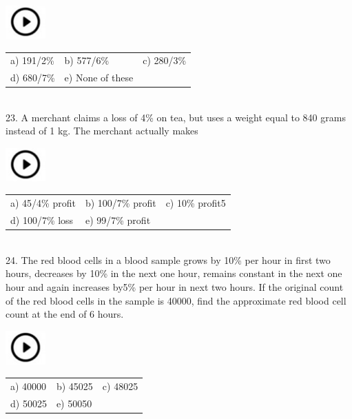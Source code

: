 \documentclass{article}
\begin{document}
\noindent   \includegraphics*[width=0.60in, height=0.52in]{images/image1} 
\begin{tabular}{p{1.7in} p{1.6in} p{1.6in}} \\ 
	a) 191/2\%   &  b) 577/6\%    & c) 280/3\%  \\
	d) 680/7\%     &     e) None of these \\
\end{tabular}
     

\noindent 

\noindent \\
23. A merchant claims a loss of 4\% on tea, but uses a weight equal to 840 grams instead of 1 kg. The merchant actually makes

\noindent   \includegraphics*[width=0.60in, height=0.52in]{images/image1} 

\begin{tabular}{p{1.7in} p{1.6in} p{1.6in}} \\ 
	a) 45/4\% profit & b) 100/7\% profit   & c) 10\% profit5 \\
	d) 100/7\% loss    &     e) 99/7\% profit \\
\end{tabular}
                                                        

\noindent 

\noindent                               

\noindent 

\noindent 

\noindent 

\noindent \\
24. The red blood cells in a blood sample grows by 10\% per hour in first two hours, decreases by 10\% in the next one hour, remains constant in the next one hour and again increases by5\% per hour in next two hours. If the original count of the red blood cells in the sample is 40000, find the approximate red blood cell count at the end of 6 hours.
 
\noindent   \includegraphics*[width=0.60in, height=0.52in]{images/image1} 
\begin{tabular}{p{1.7in} p{1.6in} p{1.6in}} \\ 
	a) 40000 & b) 45025  & c) 48025 \\
	d) 50025 &     e) 50050  \\
\end{tabular}
\end{document}
